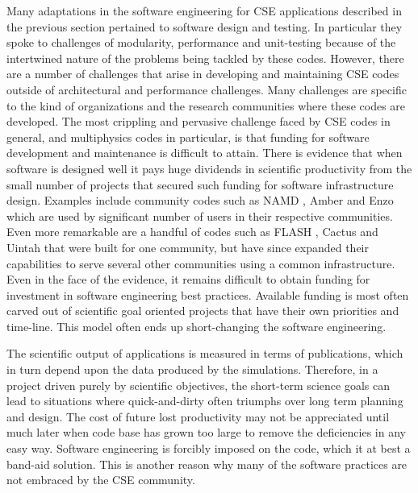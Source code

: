 
\label{sec:instChallenges}
Many adaptations in the software engineering for CSE applications described in the previous
section pertained to software design and testing. In particular they
spoke to challenges of modularity, performance and unit-testing because of the
intertwined nature of the problems being tackled by these
codes. However, there are a number of challenges that arise in developing and maintaining CSE codes outside of architectural and performance challenges.  Many challenges are specific to the kind of organizations and the research communities
where these codes are developed. The most crippling and pervasive
challenge faced by CSE codes in general, and multiphysics codes in
particular, is that funding for software development and maintenance is difficult to attain. 
There is evidence that when software is designed well
it pays huge dividends in scientific productivity from the
small number of projects that secured such funding for software
infrastructure design. Examples include community codes such as NAMD
\cite{phillips2005scalable}, Amber \cite{case2014amber} and Enzo \cite{Enzo2013} which are used by
significant number of users in their respective communities. Even more
remarkable are a handful of codes such as FLASH \cite{Dubey2009, Dubey2008},
Cactus \cite{blazewiczphysics} and Uintah \cite{uintah2,TGRID10} that were built for one community,
but have since expanded their capabilities to serve several other
communities using a common infrastructure.
Even in the face of the evidence, it remains difficult to obtain
funding for investment in software engineering best practices.
Available funding is most often carved out of scientific goal 
oriented projects that have their own priorities and time-line. This
model often ends up short-changing the software engineering.


The scientific output of applications is measured in terms of publications, which in
turn depend upon the data produced by the simulations. Therefore, in a
project driven purely by scientific objectives, the short-term science
goals can lead to situations where quick-and-dirty often triumphs over
long term planning and design.
The cost of future lost productivity may not be appreciated until much
later when code base has  grown too large to remove the deficiencies
in any easy way.  Software engineering is forcibly imposed on the
code, which it at best a band-aid solution. This is another reason why
many of the software practices are not embraced by the CSE community.  

